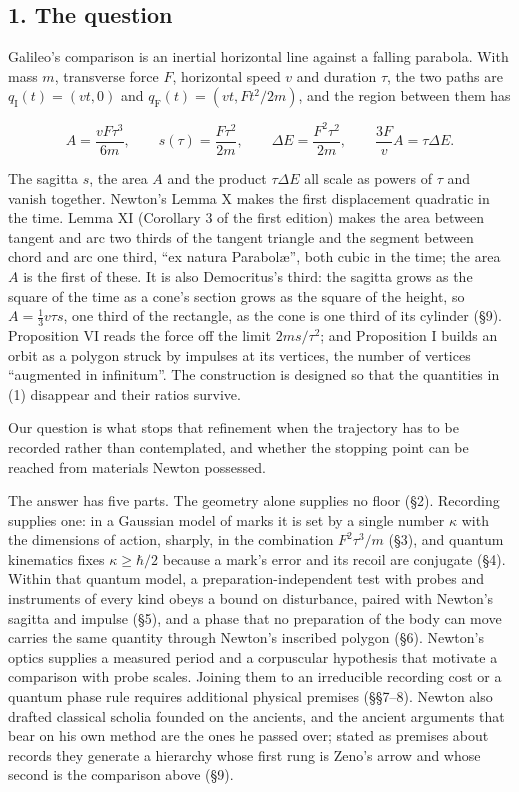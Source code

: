 \documentclass[11pt,a4paper]{article}
\begin{document}
\hypertarget{the-question}{%
\subsection{1. The question}\label{the-question}}

Galileo's comparison is an inertial horizontal line against a falling
parabola. With mass \(m\), transverse force \(F\), horizontal speed
\(v\) and duration \(\tau\), the two paths are
\(q_{\mathrm I}(t)=(vt,0)\) and \(q_{\mathrm F}(t)=(vt,Ft^2/2m)\), and
the region between them has

\[A=\frac{vF\tau^3}{6m},\qquad s(\tau)=\frac{F\tau^2}{2m},\qquad
\Delta E=\frac{F^2\tau^2}{2m},\qquad \frac{3F}{v}A=\tau\Delta E. \tag{1}\]

The sagitta \(s\), the area \(A\) and the product \(\tau\Delta E\) all
scale as powers of \(\tau\) and vanish together. Newton's Lemma X makes
the first displacement quadratic in the time. Lemma XI (Corollary 3 of
the first edition) makes the area between tangent and arc two thirds of
the tangent triangle and the segment between chord and arc one third,
``ex natura Parabolæ'', both cubic in the time; the area \(A\) is the
first of these. It is also Democritus's third: the sagitta grows as the
square of the time as a cone's section grows as the square of the
height, so \(A=\frac13v\tau s\), one third of the rectangle, as the cone
is one third of its cylinder (§9). Proposition VI reads the force off
the limit \(2ms/\tau^2\); and Proposition I builds an orbit as a polygon
struck by impulses at its vertices, the number of vertices ``augmented
in infinitum''. The construction is designed so that the quantities in
(1) disappear and their ratios survive.

Our question is what stops that refinement when the trajectory has to be
recorded rather than contemplated, and whether the stopping point can be
reached from materials Newton possessed.

The answer has five parts. The geometry alone supplies no floor (§2).
Recording supplies one: in a Gaussian model of marks it is set by a
single number \(\kappa\) with the dimensions of action, sharply, in the
combination \(F^2\tau^3/m\) (§3), and quantum kinematics fixes
\(\kappa\ge\hbar/2\) because a mark's error and its recoil are conjugate
(§4). Within that quantum model, a preparation-independent test with
probes and instruments of every kind obeys a bound on disturbance,
paired with Newton's sagitta and impulse (§5), and a phase that no
preparation of the body can move carries the same quantity through
Newton's inscribed polygon (§6). Newton's optics supplies a measured
period and a corpuscular hypothesis that motivate a comparison with
probe scales. Joining them to an irreducible recording cost or a quantum
phase rule requires additional physical premises (§§7--8). Newton also
drafted classical scholia founded on the ancients, and the ancient
arguments that bear on his own method are the ones he passed over;
stated as premises about records they generate a hierarchy whose first
rung is Zeno's arrow and whose second is the comparison above (§9).
\end{document}

